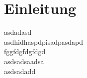 \chapter{Einleitung}
asdadasd~\cite{TS18h7}\\


asdhidhaspdpisadpasdapd~\cite{TS181}\\


fggfdgfdgfdgd~\cite{Chessence14003}\\


asdsadsaadsa~\cite{Chessence17003}\\


asdsadadd~\cite{Laeuferopfer}